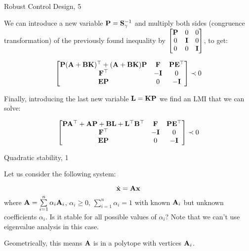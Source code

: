 \documentclass{beamer}
\begin{document}
\begin{frame}{Robust Control Design, 5}
	\begin{flushleft}
		
		We can introduce a new variable $\mathbf{P} = \mathbf{S}^{-1}_\gamma$ and multiply both sides (congruence transformation) of the previously found inequality by $\begin{bmatrix}
			\mathbf{P} & 0 & 0 \\
			0 & \mathbf{I} & 0 \\
			0 & 0 & \mathbf{I}
		\end{bmatrix}$, to get:
		
		\begin{equation}
			\begin{bmatrix}
				\mathbf{P}(\mathbf{A} + \mathbf{B}\mathbf{K})^\top + (\mathbf{A} + \mathbf{B}\mathbf{K})\mathbf{P} & \mathbf{F} & \mathbf{P}\mathbf{E}^\top \\
				\mathbf{F}^\top & -\mathbf{I} & 0 \\
				\mathbf{E}\mathbf{P} & 0 & -\mathbf{I}
			\end{bmatrix} 
			\prec 0
		\end{equation}	
		
		Finally, introducing the last new variable $\mathbf{L} = \mathbf{K}\mathbf{P}$ we find an LMI that we can solve:
		
		\begin{equation}
			\begin{bmatrix}
				\mathbf{P}\mathbf{A}^\top + \mathbf{A}\mathbf{P} + \mathbf{B}\mathbf{L} + \mathbf{L}^\top \mathbf{B}^\top & \mathbf{F} & \mathbf{P}\mathbf{E}^\top \\
				\mathbf{F}^\top & -\mathbf{I} & 0 \\
				\mathbf{E}\mathbf{P} & 0 & -\mathbf{I}
			\end{bmatrix} 
			\prec 0
		\end{equation}
		
		
	\end{flushleft}
\end{frame}







\begin{frame}{Quadratic stability, 1}
	\begin{flushleft}
		
		Let us consider the following system:
		
		\begin{equation}
			\dot{\mathbf{x}}  = \mathbf{A}\mathbf{x}
		\end{equation}
		where $\mathbf{A} = \sum\limits_{i=1}^{n} \alpha_i \mathbf{A}_i$, $\alpha_i \geq 0$, $\sum\limits_{i=1}^{n} \alpha_i = 1$ with known $\mathbf{A}_i$ but unknown coefficients $\alpha_i$. Is it stable for all possible values of $\alpha_i$? Note that we can't use eigenvalue analysis in this case.
		
		\bigskip
		
		Geometrically, this means $\mathbf{A}$ is in a polytope with vertices $\mathbf{A}_i$.
		
	\end{flushleft}
\end{frame}
\end{document}
